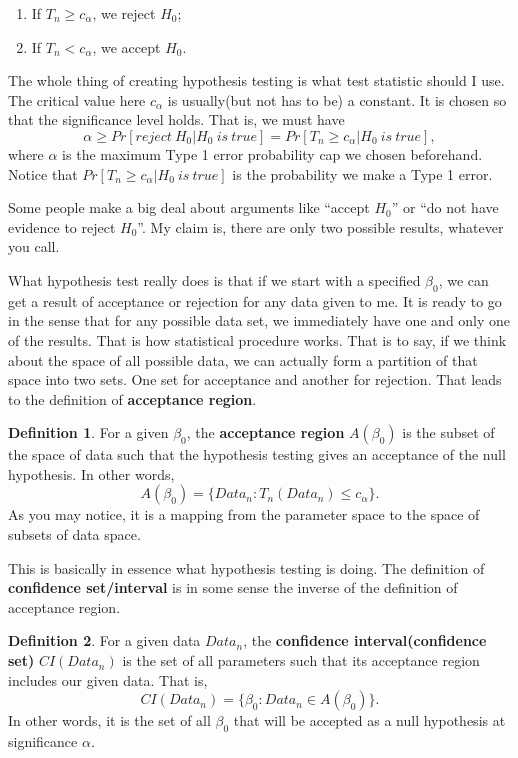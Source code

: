 \documentclass[11pt,a4paper]{amsart}
\theoremstyle{plain}
\theoremstyle{definition}
\newtheorem{definition}{Definition}
\begin{document}
	\begin{enumerate}
		\item If $T_{n} \geq c_{\alpha}$, we reject $H_{0}$;
		\item If $T_{n} < c_{\alpha}$, we accept $H_{0}$.
	\end{enumerate}
	The whole thing of creating hypothesis testing is what test statistic should I use. The critical value here $c_{\alpha}$ is usually(but not has to be) a constant. It is chosen so that the significance level holds. That is, we must have 
	\[	\alpha \geq Pr[reject~ H_{0} | H_{0}~ is ~true]	= Pr[T_{n} \geq c_{\alpha} |  H_{0}~ is ~true], \]
	where $\alpha$ is the maximum Type 1 error probability cap we chosen beforehand. Notice that $Pr[T_{n} \geq c_{\alpha} |  H_{0}~ is ~true]$ is the probability we make a Type 1 error.\par 
	Some people make a big deal about arguments like ``accept $H_{0}$'' or ``do not have evidence to reject $H_{0}$''. My claim is, there are only two possible results, whatever you call.\par 
	What hypothesis test really does is that if we start with a specified $\beta_{0}$, we can get a result of acceptance or rejection for any data given to me. It is ready to go in the sense that for any possible data set, we immediately have one and only one of the results. That is how statistical procedure works. That is to say, if we think about the space of all possible data, we can actually form a partition of that space into two sets. One set for acceptance and another for rejection. That leads to the definition of \textbf{acceptance region}. 
	\begin{definition}
		For a given $\beta_{0}$, the \textbf{acceptance region} $A(\beta_{0})$ is the subset of the space of  data such that the hypothesis testing gives an acceptance of the null hypothesis. In other words, 
		\[	A(\beta_{0}) = \{Data_{n} \colon T_{n}(Data_{n}) \leq c_{\alpha}\}.	\]
		As you may notice, it is a mapping from the parameter space to the space of subsets of data space.
	\end{definition}   
	This is basically in essence what hypothesis testing is doing. The definition of \textbf{confidence set/interval} is in some sense the inverse of the definition of acceptance region.
	\begin{definition}
		For a given data $Data_{n}$, the \textbf{confidence interval(confidence set)} $CI(Data_{n})$ is the set of all parameters such that its acceptance region includes our given data. That is, 
		\[	CI(Data_{n}) = \{\beta_{0} \colon Data_{n} \in A(\beta_{0})\}.	\]
		In other words, it is the set of all $\beta_{0}$ that will be accepted as a null hypothesis at significance $\alpha$. 
	\end{definition}
\end{document}
